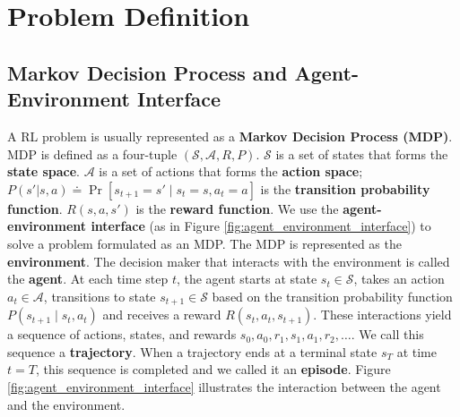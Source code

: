 \chapter{Problem Definition}

\section{Markov Decision Process and Agent-Environment Interface} \label{sec:markov}
A RL problem is usually represented as a \textbf{Markov Decision Process (MDP)}.
MDP is defined as a four-tuple $(\mathcal{S}, \mathcal{A}, R, P)$.
$\mathcal{S}$ is a set of states that forms the \textbf{state space}.
$\mathcal{A}$ is a set of actions that forms the \textbf{action space};
$P(s' | s, a) \doteq \operatorname{Pr}[ s_{t+1} = s' \mid  s_t = s, a_t = a]$ is the \textbf{transition probability function}.
$R(s, a, s')$ is the \textbf{reward function}.
We use the \textbf{agent-environment interface} (as in Figure \ref{fig:agent_environment_interface}) to solve a problem formulated as an MDP.
The MDP is represented as the \textbf{environment}.
The decision maker that interacts with the environment is called the \textbf{agent}.
At each time step $t$, the agent starts at state $s_t \in \mathcal{S}$, takes an action $a_t \in \mathcal{A}$,
transitions to state $s_{t+1} \in \mathcal{S}$ based on the transition probability function $P(s_{t+1} \mid s_t, a_t)$
and receives a reward $R(s_t, a_t, s_{t+1})$.
These interactions yield a sequence of actions, states, and rewards $s_{0}, a_{0}, r_{1}, s_{1}, a_{1}, r_{2}, \dots$.
We call this sequence a \textbf{trajectory}.
When a trajectory ends at a terminal state $s_T$ at time $t = T$, this sequence is completed and we called it an \textbf{episode}.
Figure \ref{fig:agent_environment_interface} illustrates the interaction between the agent and the environment.



